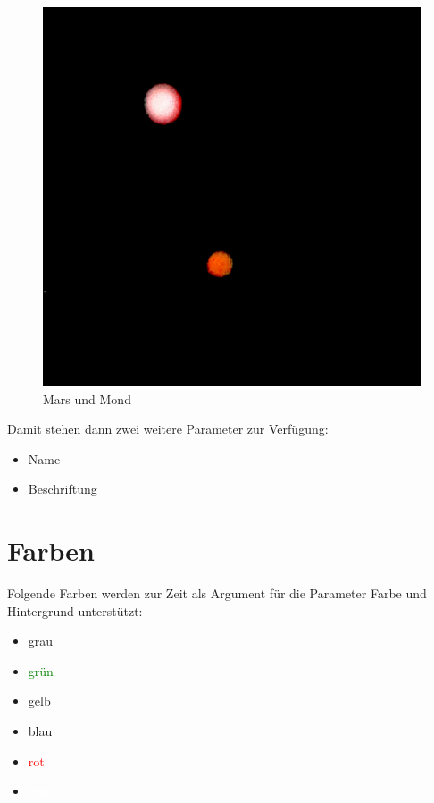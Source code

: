 \documentclass{scrartcl}
\begin{document}
\begin{figure}[hbt]
\raggedleft%
\includegraphics[height=.40\textheight]{Image.png}
\caption{Mars und Mond}
\label{bild1}
\end{figure}


{Damit stehen dann zwei weitere Parameter zur Verfügung:\\}

\begin{itemize}
\item Name
\item Beschriftung
\end{itemize}


\section{Farben}

{Folgende Farben werden zur Zeit als Argument für die
Parameter Farbe und Hintergrund unterstützt:\\}

\colorbox{gray!75}{\parbox{\linewidth}{%
\begin{itemize}
\item grau
\item \textcolor{green}{grün}
\item \textcolor{LightYellow1}{gelb}
\item \textcolor{PaleTurquoise1}{blau}
\item \textcolor{red}{rot}
\item \textcolor{white}{weiß}
\end{itemize}

}
}
\end{document}
